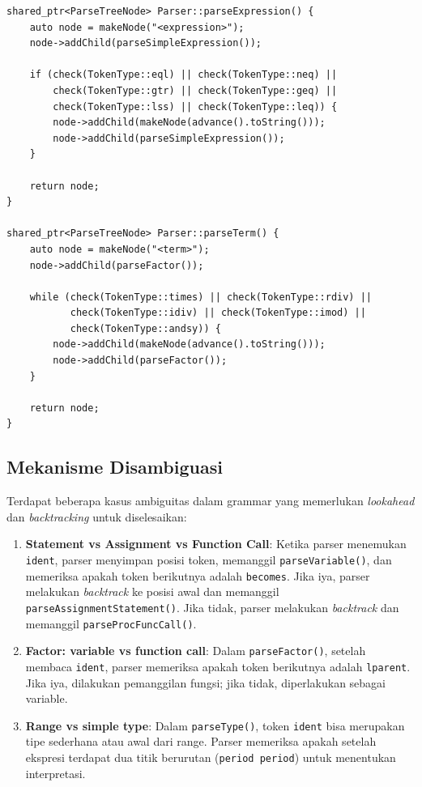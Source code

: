\documentclass[12pt,a4paper]{article}
\begin{document}
\begin{lstlisting}[style=cpp, caption={Implementasi ekspresi dengan hierarki operator}]
shared_ptr<ParseTreeNode> Parser::parseExpression() {
    auto node = makeNode("<expression>");
    node->addChild(parseSimpleExpression());

    if (check(TokenType::eql) || check(TokenType::neq) ||
        check(TokenType::gtr) || check(TokenType::geq) ||
        check(TokenType::lss) || check(TokenType::leq)) {
        node->addChild(makeNode(advance().toString()));
        node->addChild(parseSimpleExpression());
    }

    return node;
}

shared_ptr<ParseTreeNode> Parser::parseTerm() {
    auto node = makeNode("<term>");
    node->addChild(parseFactor());

    while (check(TokenType::times) || check(TokenType::rdiv) ||
           check(TokenType::idiv) || check(TokenType::imod) ||
           check(TokenType::andsy)) {
        node->addChild(makeNode(advance().toString()));
        node->addChild(parseFactor());
    }

    return node;
}
\end{lstlisting}

\subsection{Mekanisme Disambiguasi}

Terdapat beberapa kasus ambiguitas dalam grammar yang memerlukan \textit{lookahead} dan \textit{backtracking} untuk diselesaikan:

\begin{enumerate}
    \item \textbf{Statement vs Assignment vs Function Call}: Ketika parser menemukan \texttt{ident}, parser menyimpan posisi token, memanggil \texttt{parseVariable()}, dan memeriksa apakah token berikutnya adalah \texttt{becomes}. Jika iya, parser melakukan \textit{backtrack} ke posisi awal dan memanggil \texttt{parseAssignmentStatement()}. Jika tidak, parser melakukan \textit{backtrack} dan memanggil \texttt{parseProcFuncCall()}.
    \item \textbf{Factor: variable vs function call}: Dalam \texttt{parseFactor()}, setelah membaca \texttt{ident}, parser memeriksa apakah token berikutnya adalah \texttt{lparent}. Jika iya, dilakukan pemanggilan fungsi; jika tidak, diperlakukan sebagai variable.
    \item \textbf{Range vs simple type}: Dalam \texttt{parseType()}, token \texttt{ident} bisa merupakan tipe sederhana atau awal dari range. Parser memeriksa apakah setelah ekspresi terdapat dua titik berurutan (\texttt{period period}) untuk menentukan interpretasi.
\end{enumerate}
\end{document}
